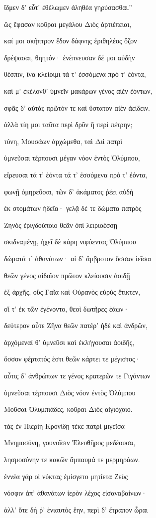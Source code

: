 \begin{pages}
\begin{Leftside}
ἴδμεν δ' εὖτ' ἐθέλωμεν ἀληθέα γηρύσασθαι.''

ὣς ἔφασαν κοῦραι μεγάλου Διὸς ἀρτιέπειαι,

καί μοι σκῆπτρον ἔδον δάφνης ἐριθηλέος ὄζον 

δρέψασαι, θηητόν· ἐνέπνευσαν δέ μοι αὐδὴν 

θέσπιν, ἵνα κλείοιμι τά τ' ἐσσόμενα πρό τ' ἐόντα, 

καί μ' ἐκέλονθ' ὑμνεῖν μακάρων γένος αἰὲν ἐόντων,

σφᾶς δ' αὐτὰς πρῶτόν τε καὶ ὕστατον αἰὲν ἀείδειν.

ἀλλὰ τίη μοι ταῦτα περὶ δρῦν ἢ περὶ πέτρην;  

τύνη, Μουσάων ἀρχώμεθα, ταὶ Διὶ πατρὶ

ὑμνεῦσαι τέρπουσι μέγαν νόον ἐντὸς Ὀλύμπου,

εἴρευσαι τά τ' ἐόντα τά τ' ἐσσόμενα πρό τ' ἐόντα,

φωνῇ ὁμηρεῦσαι, τῶν δ' ἀκάματος ῥέει αὐδὴ 

ἐκ στομάτων ἡδεῖα· γελᾷ δέ τε δώματα πατρὸς  

Ζηνὸς ἐριγδούποιο θεᾶν ὀπὶ λειριοέσσῃ

σκιδναμένῃ, ἠχεῖ δὲ κάρη νιφόεντος Ὀλύμπου 

δώματά τ' ἀθανάτων· αἱ δ' ἄμβροτον ὄσσαν ἱεῖσαι 

θεῶν γένος αἰδοῖον πρῶτον κλείουσιν ἀοιδῇ

ἐξ ἀρχῆς, οὓς Γαῖα καὶ Οὐρανὸς εὐρὺς ἔτικτεν, 

οἵ τ' ἐκ τῶν ἐγένοντο, θεοὶ δωτῆρες ἐάων· 

δεύτερον αὖτε Ζῆνα θεῶν πατέρ' ἠδὲ καὶ ἀνδρῶν, 

ἀρχόμεναί θ' ὑμνεῦσι καὶ ἐκλήγουσαι ἀοιδῆς,

ὅσσον φέρτατός ἐστι θεῶν κάρτει τε μέγιστος·

αὖτις δ' ἀνθρώπων τε γένος κρατερῶν τε Γιγάντων 

ὑμνεῦσαι τέρπουσι Διὸς νόον ἐντὸς Ὀλύμπου

Μοῦσαι Ὀλυμπιάδες, κοῦραι Διὸς αἰγιόχοιο.

τὰς ἐν Πιερίῃ Κρονίδῃ τέκε πατρὶ μιγεῖσα

Μνημοσύνη, γουνοῖσιν Ἐλευθῆρος μεδέουσα,

λησμοσύνην τε κακῶν ἄμπαυμά τε μερμηράων. 

ἐννέα γάρ οἱ νύκτας ἐμίσγετο μητίετα Ζεὺς

νόσφιν ἀπ' ἀθανάτων ἱερὸν λέχος εἰσαναβαίνων·

ἀλλ' ὅτε δή ῥ' ἐνιαυτὸς ἔην, περὶ δ' ἔτραπον ὧραι


\end{Leftside}
\end{pages}

